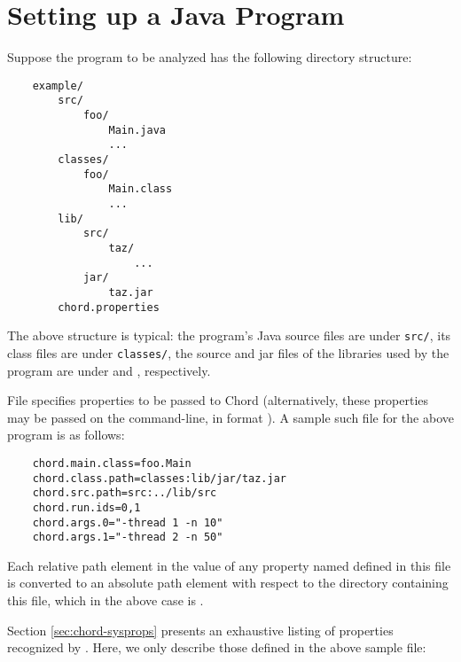 \section{Setting up a Java Program}
\label{sec:program-setup}

Suppose the program to be analyzed has the following directory structure:

\begin{verbatim}
    example/
        src/
            foo/
                Main.java
                ...
        classes/
            foo/
                Main.class
                ...
        lib/
            src/
                taz/
                    ...
            jar/
                taz.jar
        chord.properties
\end{verbatim}

\noindent The above structure is typical: the program's Java source
files are under {\tt src/}, its class files are under {\tt classes/},
the source and jar files of the libraries used by the program are
under  and , respectively.

File  specifies properties to be passed to
Chord (alternatively, these properties may be passed on the
command-line, in format ).  A sample such file
for the above program is as follows:

\begin{verbatim}
    chord.main.class=foo.Main
    chord.class.path=classes:lib/jar/taz.jar
    chord.src.path=src:../lib/src
    chord.run.ids=0,1
    chord.args.0="-thread 1 -n 10"
    chord.args.1="-thread 2 -n 50"
\end{verbatim}

Each relative path element in the value of any property named
 defined in this file is converted to an
absolute path element with respect to the directory containing this
file, which in the above case is .

Section \ref{sec:chord-sysprops} presents an exhaustive listing of
properties recognized by \Chord.  Here, we only describe those defined
in the above sample  file:

